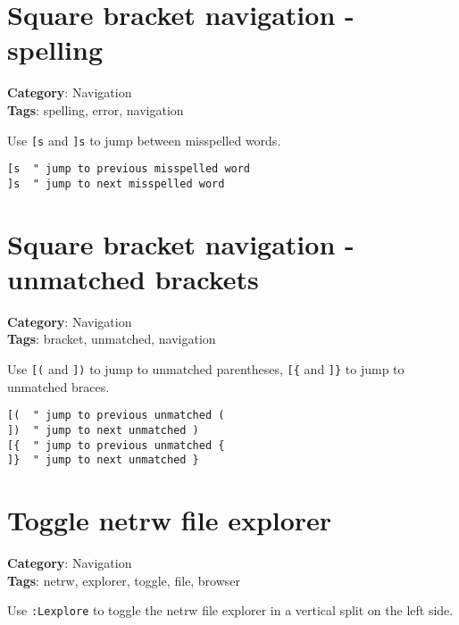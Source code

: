 {{{{{{{{{{\section{Square bracket navigation - spelling}

\textbf{Category}: Navigation\\ \textbf{Tags}: spelling, error, navigation
\vspace{0.5cm}

Use {\footnotesize \Verb§[s§} and {\footnotesize \Verb§]s§} to jump between misspelled words.

\begin{Exa*}{}
\begin{Verbatim}[fontsize=\footnotesize, breaklines, breakanywhere]
[s  " jump to previous misspelled word
]s  " jump to next misspelled word
\end{Verbatim}
\end{Exa*}

\section{Square bracket navigation - unmatched brackets}

\textbf{Category}: Navigation\\ \textbf{Tags}: bracket, unmatched, navigation
\vspace{0.5cm}

Use {\footnotesize \Verb§[(§} and {\footnotesize \Verb§])§} to jump to unmatched parentheses, {\footnotesize \Verb§[{§} and {\footnotesize \Verb§]}§} to jump to unmatched braces.

\begin{Exa*}{}
\begin{Verbatim}[fontsize=\footnotesize, breaklines, breakanywhere]
[(  " jump to previous unmatched (
])  " jump to next unmatched )
[{  " jump to previous unmatched {
]}  " jump to next unmatched }
\end{Verbatim}
\end{Exa*}

\section{Toggle netrw file explorer}

\textbf{Category}: Navigation\\ \textbf{Tags}: netrw, explorer, toggle, file, browser
\vspace{0.5cm}

Use {\footnotesize \Verb§:Lexplore§} to toggle the netrw file explorer in a vertical split on the left side.

}}}}}}}}}}
